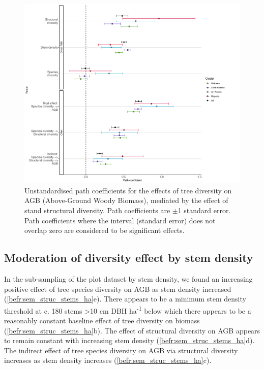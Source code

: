 \begin{refsection}
\begin{figure}
	\includegraphics[width=\linewidth]{img/struc_model_slopes_all}
	\caption[Path coefficients for vegetation type model]{Unstandardised path coefficients for the effects of tree diversity on AGB (Above-Ground Woody Biomass), mediated by the effect of stand structural diversity. Path coefficients are $\pm$1 standard error. Path coefficients where the interval (standard error) does not overlap zero are considered to be significant effects.}
	\label{befr:struc_model_slopes_all}
\end{figure}

\subsection{Moderation of diversity effect by stem density}
\label{befr:ssec:stems}

In the sub-sampling of the plot dataset by stem density, we found an increasing positive effect of tree species diversity on AGB as stem density increased (\autoref{befr:sem_struc_stems_ha}e). There appears to be a minimum stem density threshold at c. 180 stems >10 cm DBH ha\textsuperscript{-1} below which there appears to be a reasonably constant baseline effect of tree diversity on biomass (\autoref{befr:sem_struc_stems_ha}b). The effect of structural diversity on AGB appears to remain constant with increasing stem density (\autoref{befr:sem_struc_stems_ha}d). The indirect effect of tree species diversity on AGB via structural diversity increases as stem density increases (\autoref{befr:sem_struc_stems_ha}c). 


\end{refsection}
